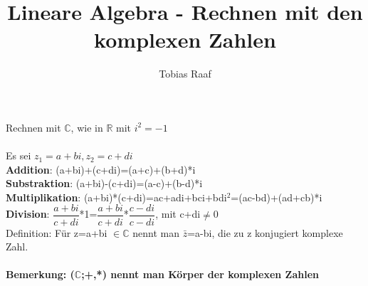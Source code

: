 \documentclass{scrartcl}
\title{Lineare Algebra - Rechnen mit den komplexen Zahlen}
\author{Tobias Raaf}
\begin{document}
	\Large Rechnen mit $\mathbb{C}$, wie in $\mathbb{R}$ mit \(i^{2}=-1\)\\
	\normalsize\\
	Es sei $z_{1}=a+bi, z_{2}=c+di$\\
	\textbf{Addition}: (a+bi)+(c+di)=(a+c)+(b+d)*i\\
	\textbf{Substraktion}: (a+bi)-(c+di)=(a-c)+(b-d)*i\\
	\textbf{Multiplikation}: (a+bi)*(c+di)=ac+adi+bci+bdi\(^{2}\)=(ac-bd)+(ad+cb)*i\\
	\textbf{Division}: $\dfrac{a+bi}{c+di}$*1=$\dfrac{a+bi}{c+di}$*$\dfrac{c-di}{c-di}$, mit c+di$\neq$0\\
	Definition: Für z=a+bi $\in \mathbb{C}$ nennt man $\bar{z}$=a-bi, die zu z konjugiert komplexe Zahl.\\
	\\
	\textbf{Bemerkung: ($\mathbb{C}$;+,*) nennt man Körper der komplexen Zahlen}
\end{document}
